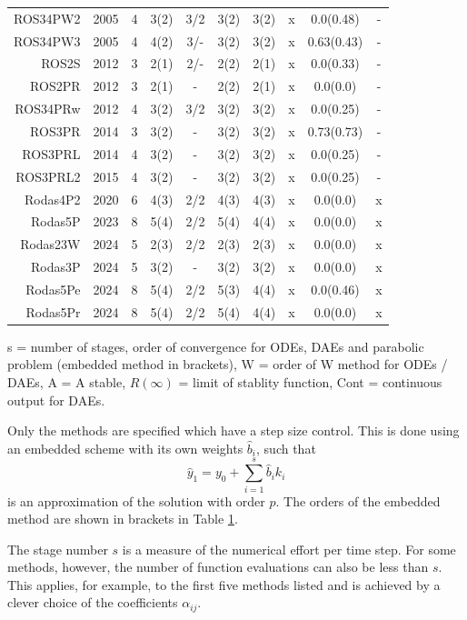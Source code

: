 \documentclass{juliacon}
\begin{document}
\begin{table}[t]
{\begin{tabular}{r|ccccccccc}
ROS34PW2 &\cite{ranga} 2005&4&3(2)&3/2&3(2)&3(2)&x&0.0(0.48)&- \\ %
ROS34PW3 &\cite{ranga} 2005&4&4(2)&3/-&3(2)&3(2)&x&0.63(0.43)&- \\
ROS2S &\cite{rang12} 2012&3&2(1)&2/-&2(2)&2(1)&x&0.0(0.33)&- \\
ROS2PR &\cite{rang12a} 2012&3&2(1)&-&2(2)&2(1)&x&0.0(0.0)&- \\
ROS34PRw &\cite{rang12a} 2012&4&3(2)&3/2&3(2)&3(2)&x&0.0(0.25)&- \\ %
ROS3PR &\cite{rang1} 2014 &3& 3(2)&-&3(2)&3(2)&x&0.73(0.73)& -\\
ROS3PRL &\cite{rang1} 2014&4&3(2)&-&3(2)&3(2)&x&0.0(0.25)&- \\
ROS3PRL2 &\cite{rang15} 2015&4&3(2)&-&3(2)&3(2)&x&0.0(0.25)&- \\
Rodas4P2 &\cite{rodas4p2} 2020&6&4(3)&2/2&4(3)&4(3)&x&0.0(0.0)&x \\ %
Rodas5P &\cite{rodas5p} 2023&8&5(4)&2/2&5(4)&4(4)& x&0.0(0.0)&x \\ %
\hline
Rodas23W &2024&5&2(3)&2/2&2(3)&2(3)&x&0.0(0.0)& x\\
Rodas3P  &2024&5&3(2)& - &3(2)&3(2)&x&0.0(0.0)& x\\
Rodas5Pe &2024&8&5(4)&2/2&5(3)&4(4)& x&0.0(0.46)&x \\ %
Rodas5Pr &2024&8&5(4)&2/2&5(4)&4(4)& x&0.0(0.0)&x \\ %
\hline 
\end{tabular}}
\label{tab:overview}
\begin{tabnote}
s = number of stages, order of convergence for ODEs, DAEs and parabolic problem (embedded
method in brackets), W = order of W method for ODEs / DAEs, A = A stable, $R(\infty)$ = limit of stablity function, Cont = continuous output for DAEs.\end{tabnote}
\end{table}

Only the methods are specified which have a step size control. This is done using an embedded scheme with its own weights $\hat b_i$, such that 
\[ \hat y_1 = y_0 + \sum_{i=1}^{s} \hat b_i k_i\]
is an approximation of the solution with order $\hat p$.
The orders of the embedded method are shown in brackets in Table \ref{tab:overview}.

The stage number $s$ is a measure of the numerical effort per time step. For some methods, however, the number of function evaluations can also be less than $s$. 
This applies, for example, to the first five methods listed and is achieved by a clever choice of the coefficients $\alpha_{ij}$.
\end{document}
